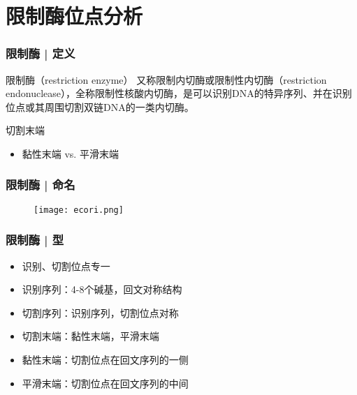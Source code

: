 \section{限制酶位点分析}
\begin{frame}
  \frametitle{限制酶 | 定义}
  \begin{block}{限制酶（restriction enzyme）}
    又称限制内切酶或限制性内切酶（restriction endonuclease），全称限制性核酸内切酶，是可以识别DNA的特异序列、并在识别位点或其周围切割双链DNA的一类内切酶。
  \end{block}
  \pause
  \begin{block}{切割末端}
    \begin{itemize}
      \item 黏性末端 vs. 平滑末端
    \end{itemize}
  \end{block}
  \begin{figure}
    \centering
  \end{figure}
\end{frame}

\begin{frame}
  \frametitle{限制酶 | \alert{命名}}
  \begin{figure}
    \centering
    \texttt{[image: ecori.png]}
  \end{figure}
\end{frame}

\begin{frame}
  \frametitle{限制酶 | \alert{型}}
  \begin{itemize}
    \item 识别、切割位点专一
    \item 识别序列：4-8个碱基，回文对称结构
    \item 切割序列：识别序列，切割位点对称
    \item 切割末端：黏性末端，平滑末端
    \item 黏性末端：切割位点在回文序列的一侧
    \item 平滑末端：切割位点在回文序列的中间
  \end{itemize}
\end{frame}

